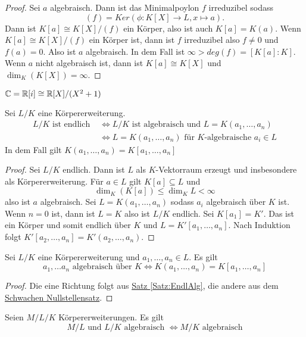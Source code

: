 \begin{proof}
    Sei \(a\) algebraisch. Dann ist das Minimalpoylon \(f\) irreduzibel sodass 
        \[(f)=Ker(\phi\colon K[X]\to L, x\mapsto a).\] Dann ist \(K[a]\cong K[X]/(f)\) ein Körper, also ist auch \(K[a]=K(a)\). 
        Wenn \(K[a]\cong K[X]/(f)\) ein Körper ist, dann ist \(f\) irreduzibel also \(f\neq 0\) und \(f(a)=0\). Also ist \(a\) algebraisch.
        In dem Fall ist \(\infty>deg(f)=[K[a]:K]\).
        Wenn \(a\) nicht algebraisch ist, dann ist \(K[a]\cong K[X]\) und \(\dim_K(K[X])=\infty.\)
\end{proof}
\begin{Bsp}
    \(\mathbb{C}=\mathbb{R}[i]\cong \mathbb{R}[X]/(X^2+1)\)
\end{Bsp}
\begin{Satz}\label{Satz:EndlAlg}
    Sei \(L/K\) eine Körpererweiterung.
    \begin{align*}
        L/K\text{ ist endlich } &\iff L/K\text{ ist algebraisch und } L=K(a_1,\dots,a_n)\\
        &\iff L=K(a_1,\dots,a_n) \text{ für \(K\)-algebraische \(a_i\in L\)}
    \end{align*}
    In dem Fall gilt \(K(a_1,\dots,a_n)=K[a_1,\dots,a_n]\)
\end{Satz}
\begin{proof}
    Sei \(L/K\) endlich. Dann ist \(L\) als \(K\)-Vektorraum erzeugt und insbesondere als Körpererweiterung. Für \(a\in L\) gilt \(K[a]\subseteq L\) und \[\dim_K(K[a])\leq\dim_KL<\infty\] also ist \(a\) algebraisch.
    Sei \(L=K(a_1,\dots,a_n)\) sodass \(a_i\) algebraisch über \(K\) ist.
    Wenn \(n=0\) ist, dann ist \(L=K\) also ist \(L/K\) endlich.
    Sei \(K[a_1]=K'\). Das ist ein Körper und somit endlich über \(K\) und \(L=K'[a_1,\dots,a_n]\). Nach Induktion folgt \(K'[a_2,\dots,a_n]=K'(a_2,\dots,a_n)\).
\end{proof}
\begin{Kor} Sei \(L/K\) eine Körpererweiterung und \(a_1,\dots,a_n\in L\). Es gilt
    \[a_1,\dots a_n \text{ algebraisch über }K \iff K(a_1,\dots,a_n)=K[a_1,\dots,a_n]\]
\end{Kor}
\begin{proof}
    Die eine Richtung folgt aus \hyperref[Satz:EndlAlg]{Satz \ref{Satz:EndlAlg}}, die andere aus dem \hyperref[Satz:WeakNst]{Schwachen Nullstellensatz}.
\end{proof}
\begin{Kor}
    Seien \(M/L/K\) Körpererweiterungen. Es gilt \[M/L \text{ und }L/K \text{ algebraisch }\iff M/K\text{ algebraisch}\]
\end{Kor}
